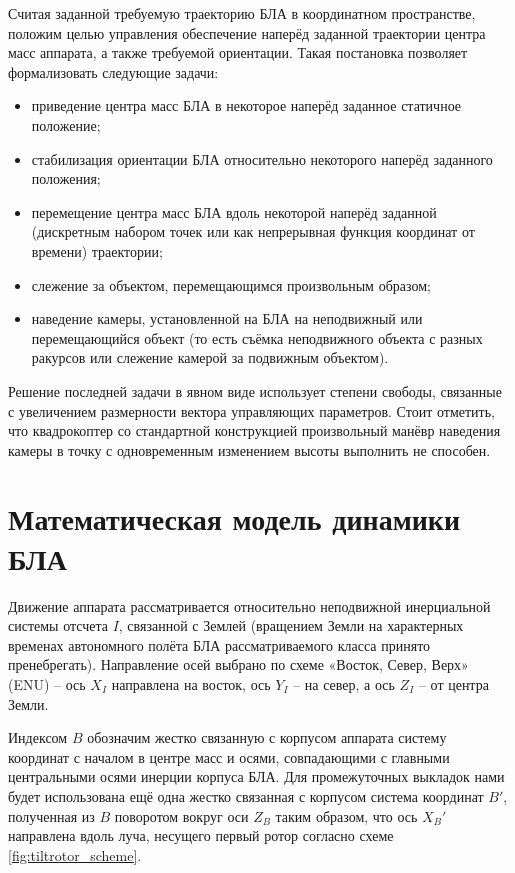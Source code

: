 Считая заданной требуемую траекторию БЛА в координатном пространстве, положим целью управления обеспечение наперёд заданной траектории центра масс аппарата, а также требуемой ориентации. Такая постановка позволяет формализовать следующие задачи:
\begin{itemize}
\item приведение центра масс БЛА в некоторое наперёд заданное статичное положение;
\item стабилизация ориентации БЛА относительно некоторого наперёд заданного положения;
\item перемещение центра масс БЛА вдоль некоторой наперёд заданной (дискретным набором точек или как непрерывная функция координат от времени) траектории;
\item слежение за объектом, перемещающимся произвольным образом;
\item наведение камеры, установленной на БЛА на неподвижный или перемещающийся объект (то есть съёмка неподвижного объекта с разных ракурсов или слежение камерой за подвижным объектом).
\end{itemize}

Решение последней задачи в явном виде использует степени свободы, связанные с увеличением размерности вектора управляющих параметров. Стоит отметить, что квадрокоптер со стандартной конструкцией произвольный манёвр наведения камеры в точку с одновременным изменением высоты выполнить не способен.

\section{Математическая модель динамики БЛА}

Движение аппарата рассматривается относительно неподвижной инерциальной системы отсчета $I$, связанной с Землей (вращением Земли на характерных временах автономного полёта БЛА рассматриваемого класса принято пренебрегать).
Направление осей выбрано по схеме «Восток, Север, Верх» (ENU) -- ось \textbf{$X_I$} направлена на восток, ось \textbf{$Y_I$} -- на север, а ось \textbf{$Z_I$} -- от центра Земли.

Индексом $B$ обозначим жестко связанную с корпусом аппарата систему координат с началом в центре масс и осями, совпадающими с главными центральными осями инерции корпуса БЛА.
Для промежуточных выкладок нами будет использована ещё одна жестко связанная с корпусом система координат $B'$, полученная из $B$ поворотом вокруг оси $Z_B$ таким образом, что ось $X_B'$ направлена вдоль луча, несущего первый ротор согласно схеме \ref{fig:tiltrotor_scheme}.

